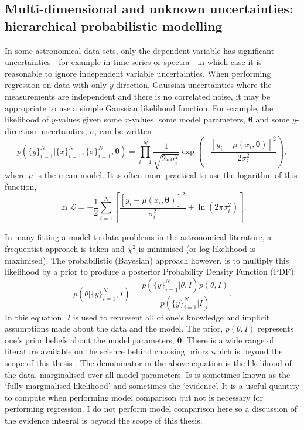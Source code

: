 \subsection{Multi-dimensional and unknown uncertainties: hierarchical
probabilistic modelling}
In some astronomical data sets, only the dependent variable has significant
uncertainties---for example in time-series or spectra---in which case it is
reasonable to ignore independent variable uncertainties.
When performing regression on data with only $y$-direction, Gaussian
uncertainties where the measurements are independent and there is no
correlated noise, it may be appropriate to use a simple Gaussian likelihood
function.
For example, the likelihood of $y$-values given some $x$-values, some model
parameters, $\mathbf{\theta}$ and some $y$-direction uncertainties, $\sigma$,
can be written
\begin{equation}
    p(\{y\}_{i=1}^N|\{x\}_{i=1}^N, \{\sigma\}_{i=1}^N, \mathbf{\theta})
    = \prod_{i=1}^N \frac{1}{\sqrt{2\pi\sigma_i^2}}
    \exp\left(-\frac{[y_i - \mu(x_i, \mathbf{\theta})]^2}{2\sigma_i^2}\right),
\end{equation}
where $\mu$ is the mean model.
It is often more practical to use the logarithm of this function,
\begin{equation}
    \ln\mathcal{L} =
    -\frac{1}{2} \sum_{i=1}^N \left[\frac{[y_i - \mu(x_i,
    \mathbf{\theta})]^2}{\sigma_i^2} +
    \ln\left(2\pi\sigma_i^2\right) \right].
\end{equation}
\label{eq:lnlike_intro}

In many fitting-a-model-to-data problems in the astronomical literature, a
frequentist approach is taken and $\chi^2$ is minimised (or log-likelihood is
maximised).
The probabilistic (Bayesian) approach however, is to multiply this likelihood
by a prior to produce a posterior Probability Density Function (PDF):
\begin{equation}
    p(\theta|\{y\}_{i=1}^N, I) = \frac{p(\{y\}_{i=1}^N|\theta, I)
    p(\theta, I)}{p(\{y\}_{i=1}^N|I)}.
\end{equation}
In this equation, $I$ is used to represent all of one's knowledge and
implicit assumptions made about the data and the model.
The prior, $p(\theta, I)$ represents one's prior beliefs about the model
parameters, $\mathbf{\theta}$.
There is a wide range of literature available on the science behind choosing
priors which is beyond the scope of this thesis \citep[\eg][]{Kass1996,
Gelman2009, Vanderplas2014}.
The denominator in the above equation is the likelihood of the data,
marginalised over all model parameters.
Is is sometimes known as the `fully marginalised likelihood' and sometimes the
`evidence'.
It is a useful quantity to compute when performing model comparison but not
is necessary for performing regression.
I do not perform model comparison here so a discussion of the evidence
integral is beyond the scope of this thesis.

